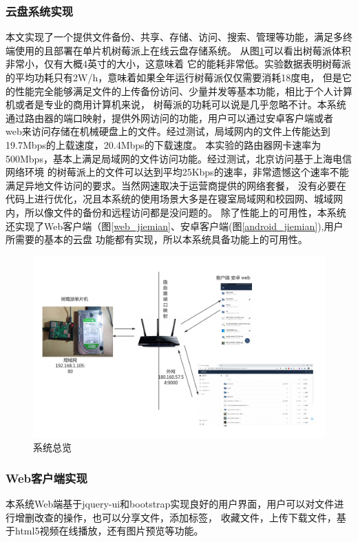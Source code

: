 \subsubsection{云盘系统实现}
\par 本文实现了一个提供文件备份、共享、存储、访问、搜索、管理等功能，满足多终端使用的且部署在单片机树莓派上在线云盘存储系统。
从图\ref{total_system}可以看出树莓派体积非常小，仅有大概4英寸的大小，这意味着
它的能耗非常低。实验数据表明树莓派的平均功耗只有2W/h，意味着如果全年运行树莓派仅仅需要消耗18度电，
但是它的性能完全能够满足文件的上传备份访问、少量并发等基本功能，相比于个人计算机或者是专业的商用计算机来说，
树莓派的功耗可以说是几乎忽略不计\cite{26}。本系统通过路由器的端口映射，提供外网访问的功能，用户可以通过安卓客户端或者
web来访问存储在机械硬盘上的文件。经过测试，局域网内的文件上传能达到19.7Mbps的上载速度，20.4Mbps的下载速度。
本实验的路由器网卡速率为500Mbps，基本上满足局域网的文件访问功能。经过测试，北京访问基于上海电信网络环境
的树莓派上的文件可以达到平均25Kbps的速率，非常遗憾这个速率不能满足异地文件访问的要求。当然网速取决于运营商提供的网络套餐，
没有必要在代码上进行优化，况且本系统的使用场景大多是在寝室局域网和校园网、城域网内，所以像文件的备份和远程访问都是没问题的。
除了性能上的可用性，本系统还实现了Web客户端（图\ref{web_jiemian}、安卓客户端(图\ref{android_jiemian}),用户所需要的基本的云盘
功能都有实现，所以本系统具备功能上的可用性。
\begin{figure}[H]
  \centering
  \includegraphics[width=130mm]{./figures/total_system.png}
  \caption{系统总览}
  \label{total_system}
\end{figure}

\subsubsection{Web客户端实现}
\par 本系统Web端基于jquery-ui和bootstrap实现良好的用户界面，用户可以对文件进行增删改查的操作，也可以分享文件，添加标签，
收藏文件，上传下载文件，基于html5视频在线播放，还有图片预览等功能。

